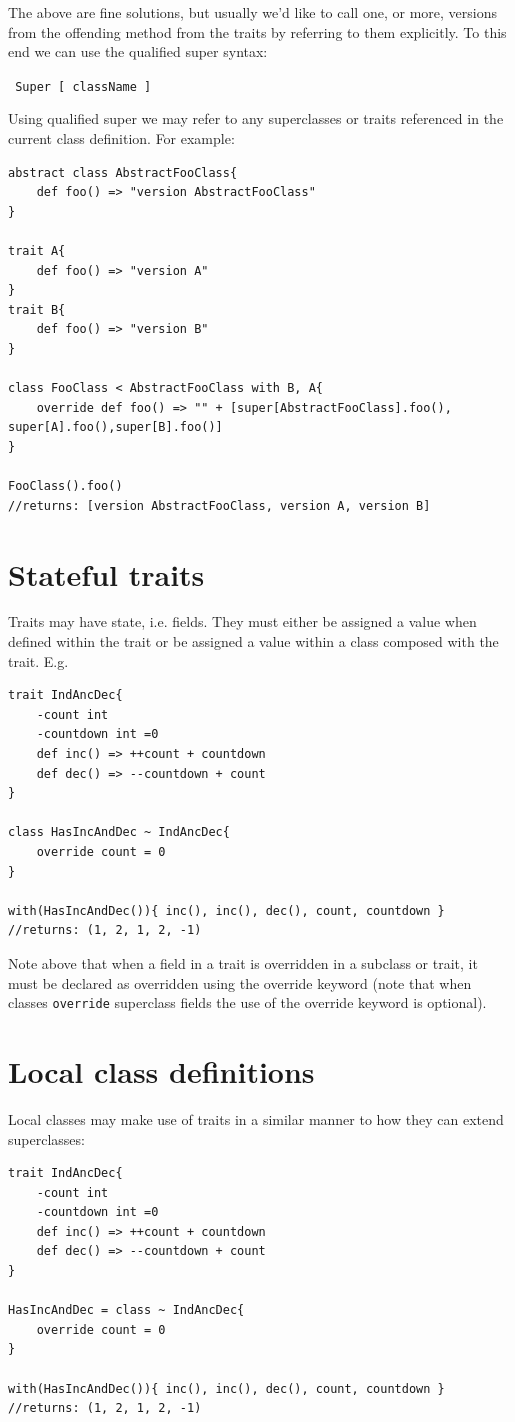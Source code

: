 \documentclass[conc-doc]{subfiles}
\begin{document}
The above are fine solutions, but usually we'd like to call one, or more, versions from the offending method from the traits by referring to them explicitly. To this end we can use the qualified super syntax:

\begin{center}
	\lstinline{ Super [ className ] }
\end{center}

Using qualified super we may refer to any superclasses or traits referenced in the current class definition. For example:
\begin{lstlisting}
abstract class AbstractFooClass{
	def foo() => "version AbstractFooClass"
}

trait A{
	def foo() => "version A"
}
trait B{
	def foo() => "version B"
}

class FooClass < AbstractFooClass with B, A{
	override def foo() => "" + [super[AbstractFooClass].foo(), super[A].foo(),super[B].foo()]
}

FooClass().foo()
//returns: [version AbstractFooClass, version A, version B]
\end{lstlisting}

\section{Stateful traits}
Traits may have state, i.e. fields. They must either be assigned a value when defined within the trait or be assigned a value within a class composed with the trait. E.g. 
\begin{lstlisting}
trait IndAncDec{
	-count int
	-countdown int =0
	def inc() => ++count + countdown
	def dec() => --countdown + count
}

class HasIncAndDec ~ IndAncDec{
	override count = 0
}

with(HasIncAndDec()){ inc(), inc(), dec(), count, countdown }
//returns: (1, 2, 1, 2, -1)
\end{lstlisting}

Note above that when a field in a trait is overridden in a subclass or trait, it must be declared as overridden using the override keyword (note that when classes \lstinline{override} superclass fields the use of the override keyword is optional).

\section{Local class definitions}
Local classes may make use of traits in a similar manner to how they can extend superclasses:
\begin{lstlisting}
trait IndAncDec{
	-count int
	-countdown int =0
	def inc() => ++count + countdown
	def dec() => --countdown + count
}

HasIncAndDec = class ~ IndAncDec{
	override count = 0
}

with(HasIncAndDec()){ inc(), inc(), dec(), count, countdown }
//returns: (1, 2, 1, 2, -1)
\end{lstlisting}
\end{document}
